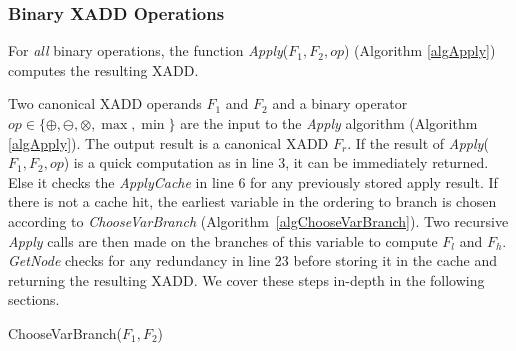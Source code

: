 \documentclass[twoside,11pt]{article}
\begin{document}
\subsubsection{Binary XADD Operations}

For \emph{all} binary operations, the function \emph{Apply}($F_1,F_2,\mathit{op}$) (Algorithm \ref{algApply}) computes the resulting XADD. 

Two canonical XADD operands $F_1$ and $F_2$ and a binary operator $\mathit{op} \in \{ \oplus, \ominus, \otimes , \max , \min \} $ are the input to the \emph{Apply} algorithm (Algorithm \ref{algApply}). The output result is a canonical XADD $F_r$. 
If the result of \emph{Apply}($F_1,F_2,\mathit{op}$) is a quick computation as in line 3, 
it can be immediately returned. Else it checks the \emph{ApplyCache} in line 6 for any previously stored apply result.  If there is not a cache hit, the earliest variable in the ordering to branch is chosen according to \emph{ChooseVarBranch}
(Algorithm~\ref{algChooseVarBranch}). Two recursive \emph{Apply} calls are then made on the branches of this variable to compute $F_l$ and $F_h$. \emph{GetNode} checks for any redundancy in line 23 before storing it in the cache and returning the resulting XADD. We cover these steps in-depth in the following sections.

\begin{algorithm}[t!]

\caption{{\sc ChooseVarBranch}($F_1,F_2$)  \label{algChooseVarBranch}}
\end{algorithm}
\end{document}
